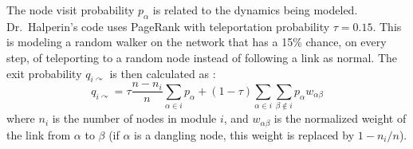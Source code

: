 The node visit probability \(p_{\alpha}\) is related to the dynamics
being modeled. Dr.~Halperin's code uses PageRank with teleportation
probability \(\tau = 0.15\). This is modeling a random walker on the
network that has a 15\% chance, on every step, of teleporting to a
random node instead of following a link as normal. The exit probability
\(q_{i\curvearrowright}\) is then calculated as
\autocite{rosvall_map_2010}:
\[q_{i\curvearrowright} = \tau \frac{n-n_i}{n} \sum_{\alpha \in i}{p_{\alpha}} + (1-\tau) \sum_{\alpha \in i}{\sum_{\beta \notin i}{p_{\alpha}w_{\alpha \beta}}}\]
where \(n_i\) is the number of nodes in module \(i\), and
\(w_{\alpha \beta}\) is the normalized weight of the link from
\(\alpha\) to \(\beta\) (if \(\alpha\) is a dangling node, this weight
is replaced by \(1-n_i/n\)).
